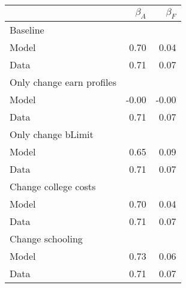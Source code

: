 \begin{tabular}{lrr}
\hline
  & $\beta_{A}$  & $\beta_{F}$  \\ 
\hline
Baseline &   &   \\ 
Model & 0.70  & 0.04  \\ 
Data & 0.71  & 0.07  \\ 
Only change earn profiles &   &   \\ 
Model & -0.00  & -0.00  \\ 
Data & 0.71  & 0.07  \\ 
Only change bLimit &   &   \\ 
Model & 0.65  & 0.09  \\ 
Data & 0.71  & 0.07  \\ 
Change college costs &   &   \\ 
Model & 0.70  & 0.04  \\ 
Data & 0.71  & 0.07  \\ 
Change schooling &   &   \\ 
Model & 0.73  & 0.06  \\ 
Data & 0.71  & 0.07  \\ 
\hline
\end{tabular}%

